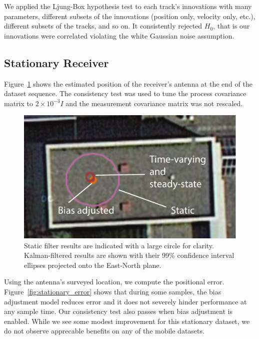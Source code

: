 We applied the Ljung-Box hypothesis test to each track's innovations with many parameters, different subsets of the innovations (position only, velocity only, etc.), different subsets of the tracks, and so on.  It consistently rejected $H_0$, that is our innovations were correlated violating the white Gaussian noise assumption.

\subsection{Stationary Receiver}
Figure~\ref{fig:stationary_map} shows the estimated position of the receiver's antenna at the end of the dataset sequence.  The consistency test was used to tune the process covariance matrix to $2\times10^{-3}I$ and the measurement covariance matrix was not rescaled.

\begin{figure}
\includegraphics[width=\columnwidth]{stationary_map}
\caption{Static filter results are indicated with a large circle for clarity.  Kalman-filtered results are shown with their 99\% confidence interval ellipses projected onto the East-North plane.}
\label{fig:stationary_map} 
\end{figure}

Using the antenna's surveyed location, we compute the positional error.  Figure~\ref{fig:stationary_error} shows that during some samples, the bias adjustment model reduces error and it does not severely hinder performance at any sample time.  Our consistency test also passes when bias adjustment is enabled.  While we see some modest improvement for this stationary dataset, we do not observe apprecable benefits on any of the mobile datasets.

